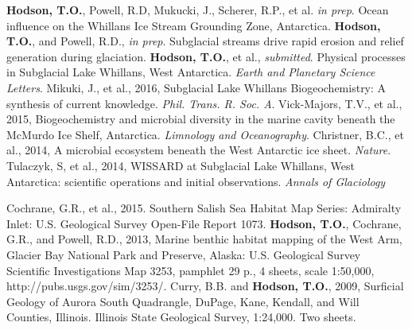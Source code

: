 \renewcommand{\refname}{Publications}
\begin{thebibliography}{1}
\bibitem{}\textbf{Hodson, T.O.}, Powell, R.D, Mukucki, J., Scherer, R.P., et al. 
\textsl{in prep}. Ocean influence on the Whillans Ice Stream Grounding Zone, Antarctica. 
\bibitem{}\textbf{Hodson, T.O.}, and Powell, R.D., \textsl{in prep}. Subglacial streams drive rapid erosion and relief generation during glaciation.
\bibitem{}\textbf{Hodson, T.O.}, et al., \textsl{submitted}. Physical processes in Subglacial Lake Whillans, West Antarctica.
\textsl{Earth and Planetary Science Letters}.
\bibitem{}Mikuki, J., et al., 2016, Subglacial Lake Whillans Biogeochemistry: A synthesis of current knowledge. \textsl{Phil. Trans. R. Soc. A}.
\bibitem{}Vick-Majors, T.V., et al., 2015, Biogeochemistry and microbial diversity in the marine cavity beneath the McMurdo Ice Shelf, Antarctica.
\textsl{Limnology and Oceanography}.
\bibitem{}Christner, B.C., et al., 2014, A microbial ecosystem beneath the West Antarctic ice sheet. \textsl{Nature}.
\bibitem{}Tulaczyk, S, et al., 2014, WISSARD at Subglacial Lake Whillans, West Antarctica: scientific operations and initial observations. \textsl{Annals of Glaciology}
\end{thebibliography}
\renewcommand{\refname}{Other Publications}
\begin{thebibliography}{1}
\bibitem{}Cochrane, G.R., et al., 2015. Southern Salish Sea Habitat Map Series: Admiralty Inlet: U.S. Geological Survey Open-File Report 1073.
\bibitem{}\textbf{Hodson, T.O.}, Cochrane, G.R., and Powell, R.D., 2013, Marine benthic habitat mapping of the West Arm, Glacier Bay National Park and Preserve, Alaska: U.S. Geological Survey Scientific Investigations Map 3253, pamphlet 29 p., 4 sheets, scale 1:50,000, http://pubs.usgs.gov/sim/3253/.
\bibitem{}Curry, B.B. and \textbf{Hodson, T.O.}, 2009, Surficial Geology of Aurora South Quadrangle, DuPage, Kane, Kendall, and Will Counties, Illinois. Illinois State Geological Survey, 1:24,000. Two sheets.
\end{thebibliography}

